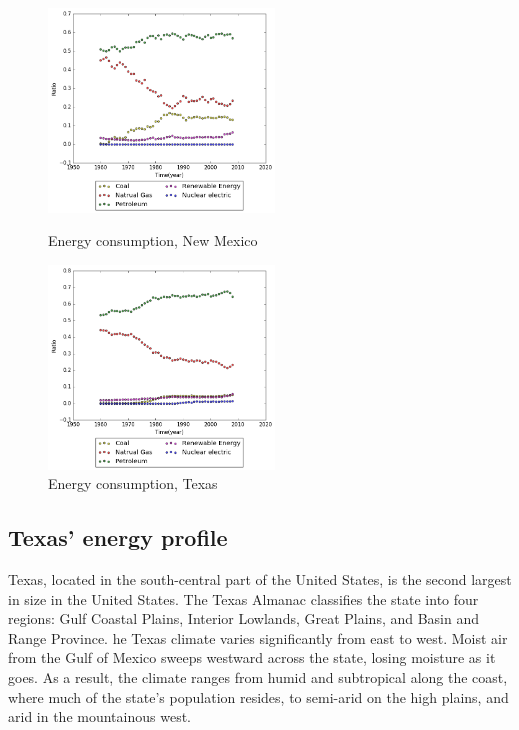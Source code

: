 \documentclass{mcmthesis}
\begin{document}
  \begin{figure}[htbp]
  \centering
  \begin{minipage}[t]{0.48\textwidth}
  \centering
  \includegraphics[width=6cm]{energyprofile_nm.png}
  \caption{Energy consumption, New Mexico}
  \end{minipage}
  \begin{minipage}[t]{0.48\textwidth}
  \centering
  \includegraphics[width=6cm]{energyprofile_tx.png}
  \caption{Energy consumption, Texas}
  \end{minipage}
  \end{figure}
\subsection{Texas' energy profile}
Texas, located in the south-central part of the United States, is the second largest in size in the United States.
The Texas Almanac classifies the state into four regions: Gulf Coastal Plains, Interior Lowlands, Great Plains, and Basin and Range Province.
he Texas climate varies significantly from east to west. Moist air from the Gulf of Mexico sweeps westward across the state, losing moisture as it goes.
 As a result, the climate ranges from humid and subtropical along the coast, where much of the state's population resides, to semi-arid on the high plains, and arid in the mountainous west.
\end{document}
